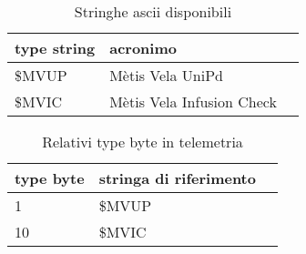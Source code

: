 \begin{table}
	\begin{center}
		\begin{tabular}{|l|l|l|}
			\hline
			type string & acronimo\\
			\hline
			\hline
			\$MVUP & Mètis Vela UniPd\\
			\$MVIC & Mètis Vela Infusion Check\\
			\hline
		\end{tabular}
	\end{center}
	\caption{Stringhe ascii disponibili} 
	\label{tab:AsciiNMEA}
\end{table}

\begin{table}
	\begin{center}
		\begin{tabular}{|l|l|l|}
			\hline
			type byte & stringa di riferimento\\
			\hline
			\hline
			1 & \$MVUP\\
			10 &  \$MVIC\\
			\hline
		\end{tabular}
	\end{center}
	\caption{Relativi type byte in telemetria} 
	\label{tab:ByteNMEA}
\end{table}